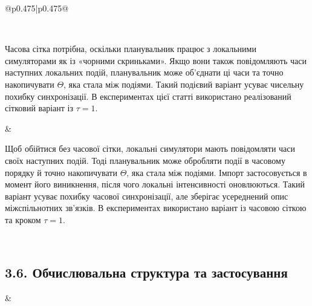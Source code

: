 ﻿\documentclass[11pt]{article}
\begin{document}
\begin{longtable}{@{}p{0.475\textwidth}|p{0.475\textwidth}@{}}
\begin{minipage}[t]{\linewidth}
\end{minipage} \\[5mm]
\begin{minipage}[t]{\linewidth}
Часова сітка потрібна, оскільки планувальник працює з локальними симуляторами як із «чорними скриньками». Якщо вони також повідомляють часи наступних локальних подій, планувальник може об'єднати ці часи та точно накопичувати $\Theta$, яка стала між подіями. Такий подієвий варіант усуває чисельну похибку синхронізації. В експериментах цієї статті використано реалізований сітковий варіант із $\tau=1$.
\end{minipage} &
\begin{minipage}[t]{\linewidth}
Щоб обійтися без часової сітки, локальні симулятори мають повідомляти часи своїх наступних подій. Тоді планувальник може обробляти події в часовому порядку й точно накопичувати $\Theta$, яка стала між подіями. Імпорт застосовується в момент його виникнення, після чого локальні інтенсивності оновлюються. Такий варіант усуває похибку часової синхронізації, але зберігає усереднений опис міжспільнотних зв'язків. В експериментах використано варіант із часовою сіткою та кроком $\tau=1$.
\end{minipage} \\[5mm]
\begin{minipage}[t]{\linewidth}
\subsection*{3.6. Обчислювальна структура та застосування}
\end{minipage} &
\begin{minipage}[t]{\linewidth}

\end{minipage}
\end{longtable}
\end{document}
